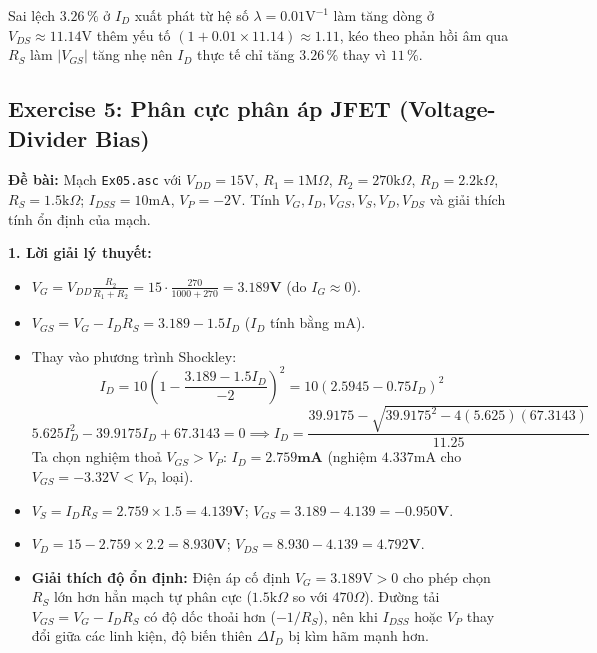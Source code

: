 \documentclass[11pt,a4paper]{article}
\newcommand{\cmd}[1]{\texttt{#1}}
\begin{document}
\begin{notebox}
Sai lệch $3.26\,\%$ ở $I_D$ xuất phát từ hệ số $\lambda=0.01\text{V}^{-1}$ làm tăng dòng ở $V_{DS} \approx 11.14\text{V}$ thêm yếu tố $(1 + 0.01\times 11.14) \approx 1.11$, kéo theo phản hồi âm qua $R_S$ làm $|V_{GS}|$ tăng nhẹ nên $I_D$ thực tế chỉ tăng $3.26\,\%$ thay vì $11\,\%$.
\end{notebox}

\subsection{Exercise 5: Phân cực phân áp JFET (Voltage-Divider Bias)}
\textbf{Đề bài:} Mạch \cmd{Ex05.asc} với $V_{DD}=15\text{V}$, $R_1=1\text{M}\Omega$, $R_2=270\text{k}\Omega$, $R_D=2.2\text{k}\Omega$, $R_S=1.5\text{k}\Omega$; $I_{DSS}=10\text{mA}$, $V_P=-2\text{V}$. Tính $V_G, I_D, V_{GS}, V_S, V_D, V_{DS}$ và giải thích tính ổn định của mạch.

\textbf{1. Lời giải lý thuyết:}
\begin{itemize}[itemsep=1pt]
  \item $V_G = V_{DD} \frac{R_2}{R_1+R_2} = 15 \cdot \frac{270}{1000+270} = \mathbf{3.189\text{V}}$ (do $I_G \approx 0$).
  \item $V_{GS} = V_G - I_D R_S = 3.189 - 1.5 I_D$ ($I_D$ tính bằng mA).
  \item Thay vào phương trình Shockley:
  $$I_D = 10\left(1 - \frac{3.189 - 1.5 I_D}{-2}\right)^2 = 10(2.5945 - 0.75 I_D)^2$$
  $$5.625 I_D^2 - 39.9175 I_D + 67.3143 = 0 \implies I_D = \frac{39.9175 - \sqrt{39.9175^2 - 4(5.625)(67.3143)}}{11.25}$$
  Ta chọn nghiệm thoả $V_{GS} > V_P$: $I_D = \mathbf{2.759\text{mA}}$ (nghiệm $4.337\text{mA}$ cho $V_{GS} = -3.32\text{V} < V_P$, loại).
  \item $V_S = I_D R_S = 2.759 \times 1.5 = \mathbf{4.139\text{V}}$; $V_{GS} = 3.189 - 4.139 = \mathbf{-0.950\text{V}}$.
  \item $V_D = 15 - 2.759 \times 2.2 = \mathbf{8.930\text{V}}$; $V_{DS} = 8.930 - 4.139 = \mathbf{4.792\text{V}}$.
  \item \textbf{Giải thích độ ổn định:} Điện áp cố định $V_G = 3.189\text{V} > 0$ cho phép chọn $R_S$ lớn hơn hẳn mạch tự phân cực ($1.5\text{k}\Omega$ so với $470\Omega$). Đường tải $V_{GS} = V_G - I_D R_S$ có độ dốc thoải hơn ($-1/R_S$), nên khi $I_{DSS}$ hoặc $V_P$ thay đổi giữa các linh kiện, độ biến thiên $\Delta I_D$ bị kìm hãm mạnh hơn.
\end{itemize}
\end{document}
